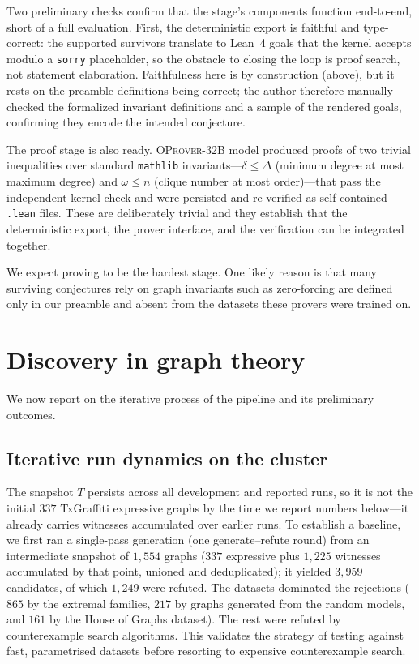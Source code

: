\documentclass[]{ceurart}
\begin{document}
Two preliminary checks confirm that the stage's components function end-to-end, short of a full
evaluation. First, the deterministic export is faithful and type-correct: the supported survivors
translate to Lean~4 goals that the kernel accepts modulo a \texttt{sorry} placeholder, so the
obstacle to closing the loop is proof search, not statement elaboration. Faithfulness here is by
construction (above), but it rests on the preamble definitions being correct; the author therefore
manually checked the formalized invariant definitions and a sample of the rendered goals, confirming they
encode the intended conjecture. 

The proof stage is also ready. \textsc{OProver-32B} model produced proofs of two trivial inequalities over standard
\texttt{mathlib} invariants---$\delta\le\Delta$ (minimum degree at most maximum degree) and $\omega\le n$
(clique number at most order)---that pass the independent kernel check and were persisted and re-verified
as self-contained \texttt{.lean} files. These are deliberately trivial and they establish that the deterministic export, the prover interface, and the verification can be integrated together. 

We expect proving to be the hardest stage. One likely reason is that many surviving conjectures rely on graph invariants such as zero-forcing are defined
only in our preamble and absent from the datasets these provers were trained on.

\section{Discovery in graph theory}
\label{sec:discovery}

We now report on the iterative process of the pipeline and its preliminary outcomes.

\subsection{Iterative run dynamics on the cluster}
\label{sec:dynamics}

The snapshot $T$ persists across all development and reported runs, so it is not the initial
$337$ TxGraffiti expressive graphs by the time we report numbers below---it already carries witnesses
accumulated over earlier runs. To establish a baseline, we first ran a single-pass generation
(one generate--refute round) from an intermediate snapshot of $1{,}554$ graphs ($337$ expressive plus
$1{,}225$ witnesses accumulated by that point, unioned and deduplicated); it yielded $3{,}959$ candidates, of which $1{,}249$ were
refuted. The datasets dominated the rejections ($865$ by the extremal families, $217$ by graphs generated from the random
models, and $161$ by the House of Graphs dataset). The rest were refuted by counterexample
search algorithms. This validates the strategy of testing against fast, parametrised datasets before
resorting to expensive counterexample search.
\end{document}
